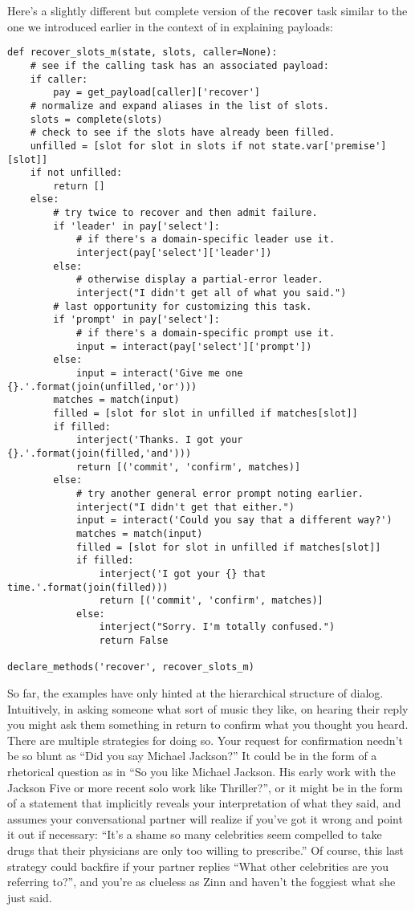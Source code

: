\documentclass[letterpaper,11pt]{article}
\begin{document}
Here's a slightly different but complete version of the {\tt{recover}} task similar to the one we introduced earlier in the context of in explaining payloads:
%
\begin{verbatim}
def recover_slots_m(state, slots, caller=None):
    # see if the calling task has an associated payload:
    if caller:
        pay = get_payload[caller]['recover']
    # normalize and expand aliases in the list of slots.
    slots = complete(slots)
    # check to see if the slots have already been filled. 
    unfilled = [slot for slot in slots if not state.var['premise'][slot]]
    if not unfilled:
        return []
    else:
        # try twice to recover and then admit failure.
        if 'leader' in pay['select']:
            # if there's a domain-specific leader use it.
            interject(pay['select']['leader'])
        else:
            # otherwise display a partial-error leader.
            interject("I didn't get all of what you said.")
        # last opportunity for customizing this task.
        if 'prompt' in pay['select']:
            # if there's a domain-specific prompt use it.
            input = interact(pay['select']['prompt'])
        else:
            input = interact('Give me one {}.'.format(join(unfilled,'or')))
        matches = match(input)
        filled = [slot for slot in unfilled if matches[slot]]
        if filled:
            interject('Thanks. I got your {}.'.format(join(filled,'and')))
            return [('commit', 'confirm', matches)]
        else:
            # try another general error prompt noting earlier.
            interject("I didn't get that either.")
            input = interact('Could you say that a different way?')
            matches = match(input)
            filled = [slot for slot in unfilled if matches[slot]]
            if filled:
                interject('I got your {} that time.'.format(join(filled)))
                return [('commit', 'confirm', matches)]
            else:
                interject("Sorry. I'm totally confused.")
                return False

declare_methods('recover', recover_slots_m)
\end{verbatim}

So far, the examples have only hinted at the hierarchical structure of dialog. Intuitively, in asking someone what sort of music they like, on hearing their reply you might ask them something in return to confirm what you thought you heard. There are multiple strategies for doing so. Your request for confirmation needn't be so blunt as ``Did you say Michael Jackson?'' It could be in the form of a rhetorical question as in ``So you like Michael Jackson. His early work with the Jackson Five or more recent solo work like Thriller?'', or it might be in the form of a statement that implicitly reveals your interpretation of what they said, and assumes your conversational partner will realize if you've got it wrong and point it out if necessary: ``It's a shame so many celebrities seem compelled to take drugs that their physicians are only too willing to prescribe.'' Of course, this last strategy could backfire if your partner replies ``What other celebrities are you referring to?'', and you're as clueless as Zinn and haven't the foggiest what she just said. 
\end{document}
